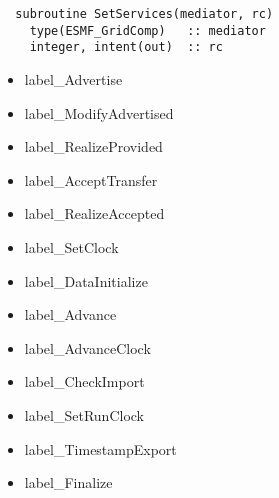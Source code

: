 \begin{verbatim}  subroutine SetServices(mediator, rc)
    type(ESMF_GridComp)   :: mediator
    integer, intent(out)  :: rc
\end{verbatim}

\begin{itemize}
\item label\_Advertise
\item label\_ModifyAdvertised
\item label\_RealizeProvided
\item label\_AcceptTransfer
\item label\_RealizeAccepted
\item label\_SetClock
\item label\_DataInitialize
\item label\_Advance
\item label\_AdvanceClock
\item label\_CheckImport
\item label\_SetRunClock
\item label\_TimestampExport
\item label\_Finalize
\end{itemize}

